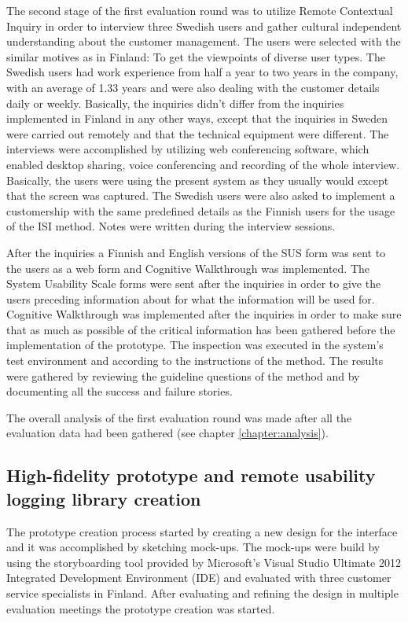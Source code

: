 \documentclass[12pt,a4paper,oneside,pdftex]{report}
\begin{document}
The second stage of the first evaluation round was to utilize Remote Contextual Inquiry in order to interview three Swedish users and gather cultural independent understanding about the customer management. The users were selected with the similar motives as in Finland: To get the viewpoints of diverse user types. The Swedish users had work experience from half a year to two years in the company, with an average of 1.33 years and were also dealing with the customer details daily or weekly. Basically, the inquiries didn't differ from the inquiries implemented in Finland in any other ways, except that the inquiries in Sweden were carried out remotely and that the technical equipment were different. The interviews were accomplished by utilizing web conferencing software, which enabled desktop sharing, voice conferencing and recording of the whole interview. Basically, the users were using the present system as they usually would except that the screen was captured. The Swedish users were also asked to implement a customership with the same predefined details as the Finnish users for the usage of the ISI method. Notes were written during the  interview sessions.

After the inquiries a Finnish and English versions of the SUS form was sent to the users as a web form and Cognitive Walkthrough was implemented. The System Usability Scale forms were sent after the inquiries in order to give the users preceding information about for what the information will be used for. Cognitive Walkthrough was implemented after the inquiries in order to make sure that as much as possible of the critical information has been gathered before the implementation of the prototype.  The inspection was executed in the system's test environment and according to the instructions of the method. The results were gathered by reviewing the guideline questions of the method and by documenting all the success and failure stories. 

The overall analysis of the first evaluation round was made after all the evaluation data had been gathered  (see chapter \ref{chapter:analysis}). 

\subsection{High-fidelity prototype and remote usability logging library creation}

The prototype creation process started by creating a new design for the interface and it was accomplished by sketching mock-ups. The mock-ups were build by using the storyboarding tool provided by Microsoft's Visual Studio Ultimate 2012 Integrated Development Environment (IDE) and evaluated with three customer service specialists in Finland. After evaluating and refining the design in multiple evaluation meetings the prototype creation was started.
\end{document}
